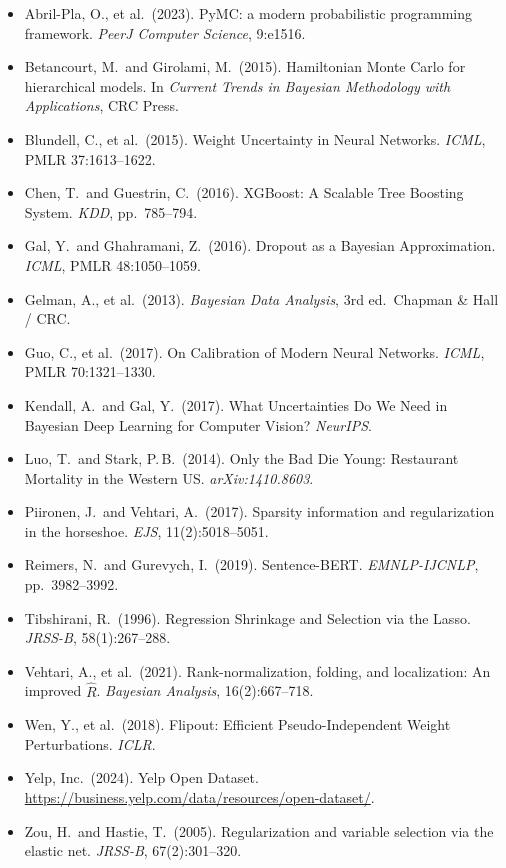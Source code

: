 \documentclass[10pt, letterpaper]{article}
\begin{document}
\begin{itemize}
  \item Abril-Pla, O., et al.\ (2023). PyMC: a modern probabilistic programming framework. \textit{PeerJ Computer Science}, 9:e1516.
  \item Betancourt, M.\ and Girolami, M.\ (2015). Hamiltonian Monte Carlo for hierarchical models. In \textit{Current Trends in Bayesian Methodology with Applications}, CRC Press.
  \item Blundell, C., et al.\ (2015). Weight Uncertainty in Neural Networks. \textit{ICML}, PMLR 37:1613--1622.
  \item Chen, T.\ and Guestrin, C.\ (2016). XGBoost: A Scalable Tree Boosting System. \textit{KDD}, pp.\ 785--794.
  \item Gal, Y.\ and Ghahramani, Z.\ (2016). Dropout as a Bayesian Approximation. \textit{ICML}, PMLR 48:1050--1059.
  \item Gelman, A., et al.\ (2013). \textit{Bayesian Data Analysis}, 3rd ed.\ Chapman \& Hall / CRC.
  \item Guo, C., et al.\ (2017). On Calibration of Modern Neural Networks. \textit{ICML}, PMLR 70:1321--1330.
  \item Kendall, A.\ and Gal, Y.\ (2017). What Uncertainties Do We Need in Bayesian Deep Learning for Computer Vision? \textit{NeurIPS}.
  \item Luo, T.\ and Stark, P.\,B.\ (2014). Only the Bad Die Young: Restaurant Mortality in the Western US. \textit{arXiv:1410.8603}.
  \item Piironen, J.\ and Vehtari, A.\ (2017). Sparsity information and regularization in the horseshoe. \textit{EJS}, 11(2):5018--5051.
  \item Reimers, N.\ and Gurevych, I.\ (2019). Sentence-BERT. \textit{EMNLP-IJCNLP}, pp.\ 3982--3992.
  \item Tibshirani, R.\ (1996). Regression Shrinkage and Selection via the Lasso. \textit{JRSS-B}, 58(1):267--288.
  \item Vehtari, A., et al.\ (2021). Rank-normalization, folding, and localization: An improved $\hat{R}$. \textit{Bayesian Analysis}, 16(2):667--718.
  \item Wen, Y., et al.\ (2018). Flipout: Efficient Pseudo-Independent Weight Perturbations. \textit{ICLR}.
  \item Yelp, Inc.\ (2024). Yelp Open Dataset. \url{https://business.yelp.com/data/resources/open-dataset/}.
  \item Zou, H.\ and Hastie, T.\ (2005). Regularization and variable selection via the elastic net. \textit{JRSS-B}, 67(2):301--320.
\end{itemize}
\end{document}

